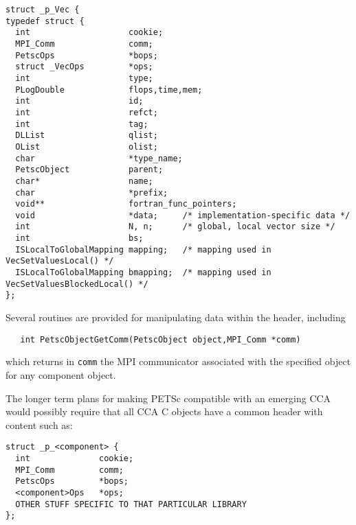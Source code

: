 \begin{verbatim}
struct _p_Vec {
typedef struct {
  int                    cookie;                                  
  MPI_Comm               comm;                                    
  PetscOps               *bops;                                   
  struct _VecOps         *ops;                                    
  int                    type;                                    
  PLogDouble             flops,time,mem;                          
  int                    id;                                      
  int                    refct;                                   
  int                    tag;                                     
  DLList                 qlist;                                   
  OList                  olist;                                   
  char                   *type_name;                              
  PetscObject            parent;                                  
  char*                  name;                                    
  char                   *prefix;                                 
  void**                 fortran_func_pointers;       
  void                   *data;     /* implementation-specific data */
  int                    N, n;      /* global, local vector size */
  int                    bs;
  ISLocalToGlobalMapping mapping;   /* mapping used in VecSetValuesLocal() */
  ISLocalToGlobalMapping bmapping;  /* mapping used in VecSetValuesBlockedLocal() */
};
\end{verbatim}

Several routines are provided for manipulating data within the header,
including
\begin{verbatim}
   int PetscObjectGetComm(PetscObject object,MPI_Comm *comm) 
\end{verbatim}
which returns in {\tt comm} 
 the MPI communicator associated with the
specified object for any component object.

The longer term plans for making PETSc compatible with an emerging
CCA would possibly require that all CCA C objects have a common header
with content such as:

\begin{verbatim}
struct _p_<component> {
  int              cookie;                                  
  MPI_Comm         comm;                                    
  PetscOps         *bops;                                   
  <component>Ops   *ops;       
  OTHER STUFF SPECIFIC TO THAT PARTICULAR LIBRARY
};
\end{verbatim}

